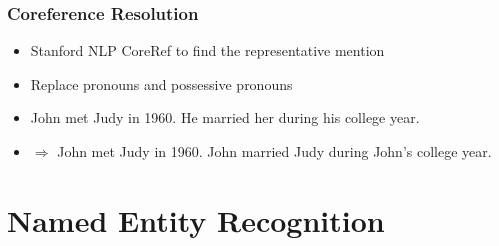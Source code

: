\documentclass{beamer}
\begin{document}
\begin{frame}
\frametitle{Coreference Resolution}
\begin{itemize}
	\item Stanford NLP CoreRef to find the representative mention
	\item Replace pronouns and possessive pronouns
\end{itemize}
\begin{example}[]
	\begin{itemize}
		\item John met Judy in 1960. He married her during his college year.
		\item[] $\Rightarrow$ John met Judy in 1960. John married Judy during John's college year.
	\end{itemize}
\end{example}
\end{frame}



\section{Named Entity Recognition}
\end{document}
